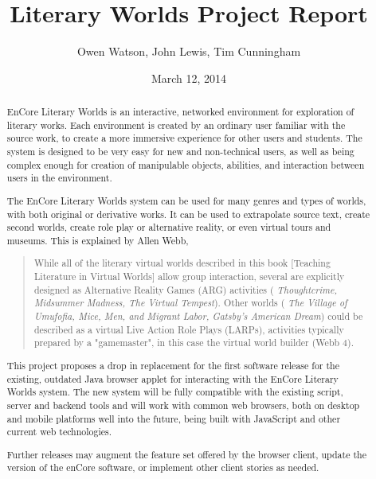 \documentclass[12pt, letterpaper]{report}
\author{Owen Watson, John Lewis, Tim Cunningham}
\title{Literary Worlds Project Report}
\date{March 12, 2014}
\begin{document}
	\begin{titlepage}
	\Huge \maketitle \par
	\end{titlepage}
	
%
	\begin{abstract}
	\par
	EnCore Literary Worlds is an interactive, networked environment for exploration of literary works. Each environment is created by an ordinary user familiar with the source work, to create a more immersive experience for other users and students. The system is designed to be very easy for new and non-technical users, as well as being complex enough for creation of manipulable objects, abilities, and interaction between users in the environment.
	
	\par
	The EnCore Literary Worlds system can be used for many genres and types of worlds, with both original or derivative works. It can be used to extrapolate source text, create second worlds, create role play or alternative reality, or even virtual tours and museums. This is explained by Allen Webb,
	
	\begin{quotation}
	While all of the literary virtual worlds described in this book [Teaching Literature in Virtual Worlds] allow group interaction, several are explicitly designed as Alternative Reality Games (ARG) activities (%
	\textit{Thoughtcrime, Midsummer Madness, The Virtual Tempest}). Other worlds (%
	\textit{The Village of Umufofia, Mice, Men, and Migrant Labor, Gatsby's American Dream})
	could be described as a virtual Live Action Role Plays (LARPs), activities typically prepared by a "gamemaster", in this case the virtual world builder (Webb 4).
	\end{quotation}
	
	\par
	This project proposes a drop in replacement for the first software release for the existing, outdated Java browser applet for interacting with the EnCore Literary Worlds system. The new system will be fully compatible with the existing script, server and backend tools and will work with common web browsers, both on desktop and mobile platforms well into the future, being built with JavaScript and other current web technologies.
		
	\par
    Further releases may augment the feature set offered by the browser client, update the version of the enCore software, or implement other client stories as needed.
    \end{abstract}
\end{document}
